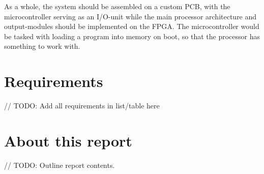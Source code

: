 As a whole, the system should be assembled on a custom PCB, with the microcontroller serving as an I/O-unit while the main processor architecture and output-modules should be implemented on the FPGA.
The microcontroller would be tasked with loading a program into memory on boot, so that the processor has something to work with.

\section{Requirements}

// TODO: Add all requirements in list/table here

\section{About this report}

// TODO: Outline report contents.

